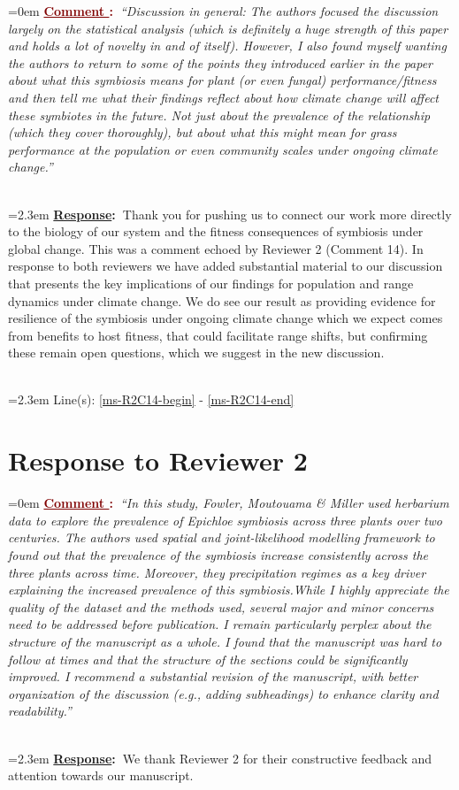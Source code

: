 \documentclass[12pt]{article}
\newcounter{cN}
\newcommand{\comment}[1]{
	\vspace{2em}
	\refstepcounter{cN} %
	\noindent \hangindent=0em \textbf{\textcolor{Maroon}{\uline{Comment \thecN}:~}}\emph{``#1''}
	}
\newcommand{\response}[1]{
	\\[0.25em]
	\hangindent=2.3em \textbf{\textcolor{NavyBlue}{\uline{Response}:~}}#1
	}
\newcommand{\linesref}[2]{
		\\[0.25em]
	\hangindent=2.3em {\color{Mahogany} Line(s): \ref{#1} - \ref{#2}}
}
\begin{document}
\comment{Discussion in general: The authors focused the discussion largely on the statistical analysis (which is definitely a huge strength of this paper and holds a lot of novelty in and of itself). However, I also found myself wanting the authors to return to some of the points they introduced earlier in the paper about what this symbiosis means for plant (or even fungal) performance/fitness and then tell me what their findings reflect about how climate change will affect these symbiotes in the future. Not just about the prevalence of the relationship (which they cover thoroughly), but about what this might mean for grass performance at the population or even community scales under ongoing climate change.}
\response{Thank you for pushing us to connect our work more directly to the biology of our system and the fitness consequences of symbiosis under global change. This was a comment echoed by Reviewer 2 (Comment 14). In response to both reviewers we have added substantial material to our discussion that presents the key implications of our findings for population and range dynamics under climate change. We do see our result as providing evidence for resilience of the symbiosis under ongoing climate change which we expect comes from benefits to host fitness, that could facilitate range shifts, but confirming these remain open questions, which we suggest in the new discussion.}
\linesref{ms-R2C14-begin}{ms-R2C14-end}


\section{Response to Reviewer 2}
\vspace{-2em}

\comment{In this study, Fowler, Moutouama \& Miller used herbarium data to explore the prevalence of Epichloe symbiosis across three plants over two centuries. The authors used spatial and joint-likelihood modelling framework to found out that the prevalence of the symbiosis increase consistently across the three plants across time. Moreover, they precipitation regimes as a key driver explaining the increased prevalence of this symbiosis.While I highly appreciate the quality of the dataset and the methods used, several major and minor concerns need to be addressed before publication. I remain particularly perplex about the structure of the manuscript as a whole. I found that the manuscript was hard to follow at times and that the structure of the sections could be significantly improved. I recommend a substantial revision of the manuscript, with better organization of the discussion (e.g., adding subheadings) to enhance clarity and readability.}
\response{We thank Reviewer 2 for their constructive feedback and attention towards our manuscript.}
\end{document}
